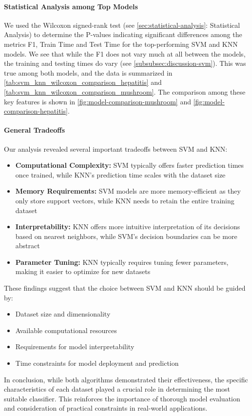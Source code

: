 \paragraph{Statistical Analysis among Top Models}
We used the Wilcoxon signed-rank test (see \autoref{sec:statistical-analysis}: Statistical Analysis) to determine
the P-values indicating significant differences among the metrics F1, Train Time and Test Time for the 
top-performing SVM and KNN models.
We see that while the F1 does not vary much at all between the models, the training and testing times do vary (see \autoref{subsubsec:discussion-svm}).
This was true among both models, and the data is summarized in \autoref{tab:svm_knn_wilcoxon_comparison_hepatitis} and \autoref{tab:svm_knn_wilcoxon_comparison_mushroom}.
The comparison among these key features is shown in \autoref{fig:model-comparison-mushroom} and \autoref{fig:model-comparison-hepatitis}.

\paragraph{General Tradeoffs}
Our analysis revealed several important tradeoffs between SVM and KNN:

\begin{itemize}
    \item \textbf{Computational Complexity:} SVM typically offers faster prediction times once trained, while KNN's prediction time scales with the dataset size
    \item \textbf{Memory Requirements:} SVM models are more memory-efficient as they only store support vectors, while KNN needs to retain the entire training dataset
    \item \textbf{Interpretability:} KNN offers more intuitive interpretation of its decisions based on nearest neighbors, while SVM's decision boundaries can be more abstract
    \item \textbf{Parameter Tuning:} KNN typically requires tuning fewer parameters, making it easier to optimize for new datasets
\end{itemize}

These findings suggest that the choice between SVM and KNN should be guided by:
\begin{itemize}
    \item Dataset size and dimensionality
    \item Available computational resources
    \item Requirements for model interpretability
    \item Time constraints for model deployment and prediction
\end{itemize}

In conclusion, while both algorithms demonstrated their effectiveness, the specific characteristics of each dataset played a crucial role in determining the most suitable classifier. This reinforces the importance of thorough model evaluation and consideration of practical constraints in real-world applications.

